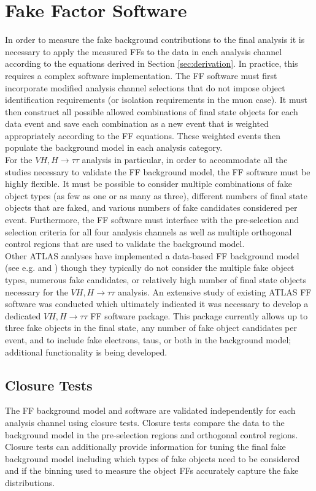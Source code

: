 \section{Fake Factor Software}
In order to measure the fake background contributions to the final analysis it is necessary to apply the measured FFs to the data in each analysis channel according to the equations derived in Section \ref{sec:derivation}. In practice, this requires a complex software implementation. The FF software must first incorporate modified analysis channel selections that do not impose object identification requirements (or isolation requirements in the muon case). It must then construct all possible allowed combinations of final state objects for each data event and save each combination as a new event that is weighted appropriately according to the FF equations. These weighted events then populate the background model in each analysis category.\\

For the $VH,H\rightarrow\tau\tau$ analysis in particular, in order to accommodate all the studies necessary to validate the FF background model, the FF software must be highly flexible. It must be possible to consider multiple combinations of fake object types (as few as one or as many as three),  different numbers of final state objects that are faked, and various numbers of fake candidates considered per event. Furthermore, the FF software must interface with the pre-selection and selection criteria for all four analysis channels as well as multiple orthogonal control regions that are used to validate the background model.\\

Other ATLAS analyses have implemented a data-based FF background model (see e.g. \cite{fake_tau_paper} and \cite{run2_htautau}) though they typically do not consider the multiple fake object types, numerous fake candidates, or relatively high number of final state objects necessary for the $VH,H\rightarrow\tau\tau$ analysis. An extensive study of existing ATLAS FF software was conducted which ultimately indicated it was necessary to develop a dedicated $VH,H\rightarrow\tau\tau$ FF software package. This package currently allows up to three fake objects in the final state, any number of fake object candidates per event, and to include fake electrons, taus, or both in the background model; additional functionality is being developed.

\subsection{Closure Tests}\label{sec:closure}
The FF background model and software are validated independently for each analysis channel using closure tests. Closure tests compare the data to the background model in the pre-selection regions and orthogonal control regions. Closure tests can additionally provide information for tuning the final fake background model including which types of fake objects need to be considered and if the binning used to measure the object FFs accurately capture the fake distributions.\\

